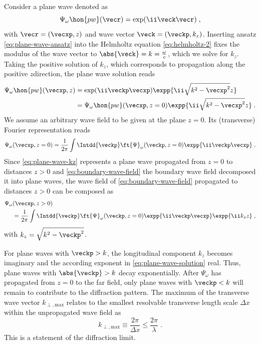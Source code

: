 \documentclass[
twoside,
openright,
titlepage,
numbers=noenddot,
headinclude,
fleqn,
a4paper,
footinclude=true,
cleardoublepage=empty,
abstractoff,
BCOR=5mm,
paper=a4,
fontsize=11pt,
british,ngerman,american,
]{scrreprt}
\begin{document}
Consider a plane wave denoted as
\begin{equation}
  \label{eq:plane-wave-ansatz}
  \Psi_\omega\hon{p w}(\vecr)=\exp(\ii \veck\vecr) \;,
\end{equation}
with $\vecr=(\vecxp,z)$ and wave vector $\veck=(\veckp,k_z)$.
Inserting ansatz \cref{eq:plane-wave-ansatz} into the Helmholtz
equation \eqref{eq:helmholtz-2} fixes the modulus of the wave vector
to $\abs{\veck}=k=\frac{\omega}{c}$, which we solve for $k_z$.  Taking
the positive solution of $k_z$, which corresponds to propagation along
the positive $z$\hyph direction, the plane wave solution reads
\begin{equation}
  \label{eq:plane-wave-kz}
  \begin{split}
    \Psi_\omega\hon{p w}(\vecxp,z) 
    & = \exp(\ii\veckp\vecxp)\expp{\ii\sqrt{k^2-\vecxp^2}z}
    \\ & = \Psi_\omega\hon{p w}(\vecxp,z=0) \expp{\ii\sqrt{k^2-\vecxp^2}z} \;.
  \end{split}
\end{equation}
We assume an arbitrary wave field to be given at the plane $z=0$.  Its
(transverse) Fourier representation reads
\begin{equation}
  \label{eq:boundary-wave-field}
  \Psi_\omega(\vecxp,z=0) 
  = \frac{1}{2\pi}\int\Intdd{\veckp}\ft{\Psi}_\omega(\veckp,z=0)
  \expp{\ii\veckp\vecxp} \;.
\end{equation}
Since \cref{eq:plane-wave-kz} represents a plane wave propagated from
$z=0$ to distances $z>0$ and \cref{eq:boundary-wave-field} the
boundary wave field decomposed it into plane waves, the wave field of
\cref{eq:boundary-wave-field} propagated to distances $z>0$ can be
composed as
\begin{equation}
  \label{eq:plane-wave-solution}
  \begin{split}
      \Psi_\omega&(\vecxp,z>0) 
 \\ & =  \frac{1}{2\pi} \int\Intdd{\veckp}
  \ft{\Psi}_\omega(\veckp,z=0)\expp{\ii\veckp\vecxp}\expp{\ii k_z z} \;,
  \end{split}
\end{equation}
with $k_z =\sqrt{k^2-\veckp^2}$. 

For plane waves with $\veckp>k$, the longitudinal component $k_z$
becomes imaginary and the according exponent in
\cref{eq:plane-wave-solution} real.  Thus, plane waves with
$\abs{\veckp}>k$ decay exponentially.  After $\Psi_\omega$ has
propagated from $z=0$ to the far field, only plane waves with
$\veckp<k$ will remain to contribute to the diffraction pattern.  The
maximum of the transverse wave vector $k_{\perp,\mathrm{max}}$ relates
to the smallest resolvable transverse length scale $\Delta x$ within
the unpropagated wave field as
\begin{equation}
  \label{eq:diffraction-limit}
  k_{\perp,\mathrm{max}}\equiv\frac{2\pi}{\Delta x} 
  \le\frac{2\pi}{\lambda} \;.
\end{equation}
This is a statement of the diffraction limit.
\end{document}
